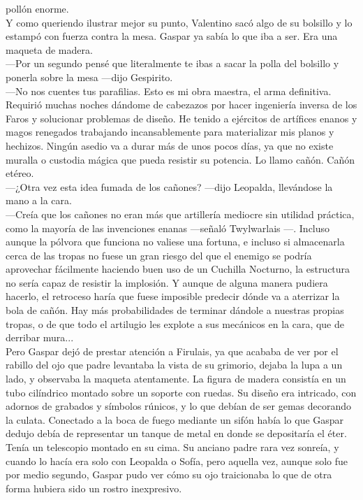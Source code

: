 \documentclass[
  letterpaper,
]{book}
\begin{document}
pollón enorme.\\
Y como queriendo ilustrar mejor su punto, Valentino sacó algo de su
bolsillo y lo estampó con fuerza contra la mesa. Gaspar ya sabía lo que
iba a ser. Era una maqueta de madera.\\
---Por un segundo pensé que literalmente te ibas a sacar la polla del
bolsillo y ponerla sobre la mesa ---dijo Gespirito.\\
---No nos cuentes tus parafilias. Esto es mi obra maestra, el arma
definitiva. Requirió muchas noches dándome de cabezazos por hacer
ingeniería inversa de los Faros y solucionar problemas de diseño. He
tenido a ejércitos de artífices enanos y magos renegados trabajando
incansablemente para materializar mis planos y hechizos. Ningún asedio
va a durar más de unos pocos días, ya que no existe muralla o custodia
mágica que pueda resistir su potencia. Lo llamo cañón. Cañón etéreo.\\
---¿Otra vez esta idea fumada de los cañones? ---dijo Leopalda,
llevándose la mano a la cara.\\
---Creía que los cañones no eran más que artillería mediocre sin
utilidad práctica, como la mayoría de las invenciones enanas ---señaló
Twylwarlais ---. Incluso aunque la pólvora que funciona no valiese una
fortuna, e incluso si almacenarla cerca de las tropas no fuese un gran
riesgo del que el enemigo se podría aprovechar fácilmente haciendo buen
uso de un Cuchilla Nocturno, la estructura no sería capaz de resistir la
implosión. Y aunque de alguna manera pudiera hacerlo, el retroceso haría
que fuese imposible predecir dónde va a aterrizar la bola de cañón. Hay
más probabilidades de terminar dándole a nuestras propias tropas, o de
que todo el artilugio les explote a sus mecánicos en la cara, que de
derribar mura...\\
Pero Gaspar dejó de prestar atención a Firulais, ya que acababa de ver
por el rabillo del ojo que padre levantaba la vista de su grimorio,
dejaba la lupa a un lado, y observaba la maqueta atentamente. La figura
de madera consistía en un tubo cilíndrico montado sobre un soporte con
ruedas. Su diseño era intricado, con adornos de grabados y símbolos
rúnicos, y lo que debían de ser gemas decorando la culata. Conectado a
la boca de fuego mediante un sifón había lo que Gaspar dedujo debía de
representar un tanque de metal en donde se depositaría el éter. Tenía un
telescopio montado en su cima. Su anciano padre rara vez sonreía, y
cuando lo hacía era solo con Leopalda o Sofía, pero aquella vez, aunque
solo fue por medio segundo, Gaspar pudo ver cómo su ojo traicionaba lo
que de otra forma hubiera sido un rostro inexpresivo.
\end{document}
